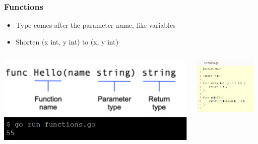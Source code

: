 \documentclass[14pt]{beamer}
\begin{document}
{
\begin{frame}
    \frametitle{Functions}
    \begin{itemize}
        \item Type comes after the parameter name, like variables
        \item Shorten (x int, y int) to (x, y int)
    \end{itemize}
    \begin{columns}
        \begin{column}{0.5\textwidth}
            \includegraphics[width=\linewidth]{img/function.PNG}
            \linebreak
            \linebreak
            \linebreak
            \linebreak
            \includegraphics[width=\linewidth]{img/functionscommand.PNG}
        \end{column}
        \begin{column}{0.5\textwidth}
            \includegraphics[width=\linewidth]{img/functions.PNG}
        \end{column}
    \end{columns}
\end{frame}
}
\end{document}
